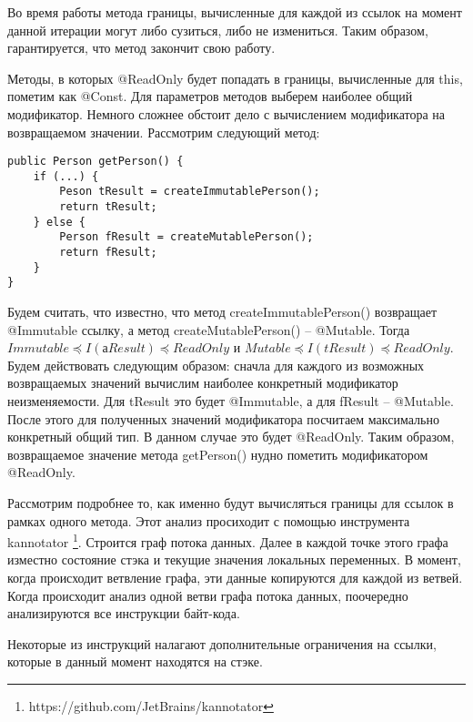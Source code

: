Во время работы метода границы, вычисленные для каждой из ссылок на момент данной итерации могут либо сузиться, либо не измениться. Таким образом, гарантируется, что метод закончит свою работу.

Методы, в которых @ReadOnly будет попадать в границы, вычисленные для this, пометим как @Const. Для параметров методов выберем наиболее общий модификатор. Немного сложнее обстоит дело с вычислением модификатора на возвращаемом значении. Рассмотрим следующий метод:

\begin{lstlisting}[caption=Вывод модификатора неизменяемости для возвращаемого методом значения, label=code:return_value_analyze]
public Person getPerson() {
    if (...) {
        Peson tResult = createImmutablePerson();
        return tResult;
    } else {
        Person fResult = createMutablePerson();
        return fResult;
    } 
} 
\end{lstlisting}

Будем считать, что известно, что метод createImmutablePerson() возвращает @Immutable ссылку, а метод createMutablePerson() -- @Mutable. Тогда $Immutable \preceq I(аResult) \preceq ReadOnly$ и $Mutable \preceq I(tResult) \preceq ReadOnly$. Будем действовать следующим образом: сначла для каждого из возможных возвращаемых значений вычислим наиболее конкретный модификатор неизменяемости. Для tResult это будет @Immutable, а для fResult -- @Mutable. После этого для полученных значений модификатора посчитаем максимально конкретный общий тип. В данном случае это будет @ReadOnly. Таким образом, возвращаемое значение метода getPerson() нудно пометить модификатором @ReadOnly. 

Рассмотрим подробнее то, как именно будут вычисляться границы для ссылок в рамках одного метода. Этот анализ просиходит с помощью инструмента kannotator \footnote{https://github.com/JetBrains/kannotator}. Строится граф потока данных. Далее в каждой точке этого графа изместно состояние стэка и текущие значения локальных переменных. В момент, когда происходит ветвление графа, эти данные копируются для каждой из ветвей. Когда происходит анализ одной ветви графа потока данных, поочередно анализируются все инструкции байт-кода. 

Некоторые из инструкций налагают дополнительные ограничения на ссылки, которые в данный момент находятся на стэке.

